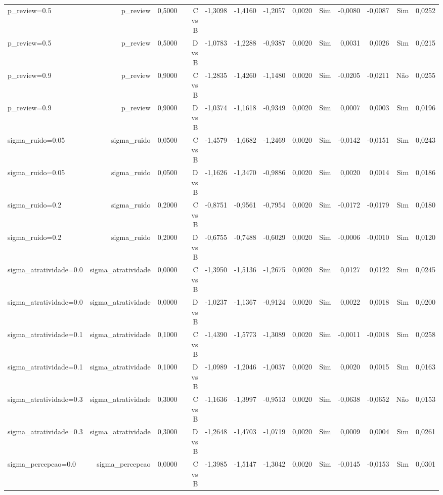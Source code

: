 \begin{table}[ht]
\begin{tabular}{lrrrrrrrrrrrr}
p\_review=0.5 & p\_review & 0,5000 & C vs B & -1,3098 & -1,4160 & -1,2057 & 0,0020 & Sim & -0,0080 & -0,0087 & Sim & 0,0252 \\
p\_review=0.5 & p\_review & 0,5000 & D vs B & -1,0783 & -1,2288 & -0,9387 & 0,0020 & Sim & 0,0031 & 0,0026 & Sim & 0,0215 \\
p\_review=0.9 & p\_review & 0,9000 & C vs B & -1,2835 & -1,4260 & -1,1480 & 0,0020 & Sim & -0,0205 & -0,0211 & Não & 0,0255 \\
p\_review=0.9 & p\_review & 0,9000 & D vs B & -1,0374 & -1,1618 & -0,9349 & 0,0020 & Sim & 0,0007 & 0,0003 & Sim & 0,0196 \\
sigma\_ruido=0.05 & sigma\_ruido & 0,0500 & C vs B & -1,4579 & -1,6682 & -1,2469 & 0,0020 & Sim & -0,0142 & -0,0151 & Sim & 0,0243 \\
sigma\_ruido=0.05 & sigma\_ruido & 0,0500 & D vs B & -1,1626 & -1,3470 & -0,9886 & 0,0020 & Sim & 0,0020 & 0,0014 & Sim & 0,0186 \\
sigma\_ruido=0.2 & sigma\_ruido & 0,2000 & C vs B & -0,8751 & -0,9561 & -0,7954 & 0,0020 & Sim & -0,0172 & -0,0179 & Sim & 0,0180 \\
sigma\_ruido=0.2 & sigma\_ruido & 0,2000 & D vs B & -0,6755 & -0,7488 & -0,6029 & 0,0020 & Sim & -0,0006 & -0,0010 & Sim & 0,0120 \\
sigma\_atratividade=0.0 & sigma\_atratividade & 0,0000 & C vs B & -1,3950 & -1,5136 & -1,2675 & 0,0020 & Sim & 0,0127 & 0,0122 & Sim & 0,0245 \\
sigma\_atratividade=0.0 & sigma\_atratividade & 0,0000 & D vs B & -1,0237 & -1,1367 & -0,9124 & 0,0020 & Sim & 0,0022 & 0,0018 & Sim & 0,0200 \\
sigma\_atratividade=0.1 & sigma\_atratividade & 0,1000 & C vs B & -1,4390 & -1,5773 & -1,3089 & 0,0020 & Sim & -0,0011 & -0,0018 & Sim & 0,0258 \\
sigma\_atratividade=0.1 & sigma\_atratividade & 0,1000 & D vs B & -1,0989 & -1,2046 & -1,0037 & 0,0020 & Sim & 0,0020 & 0,0015 & Sim & 0,0163 \\
sigma\_atratividade=0.3 & sigma\_atratividade & 0,3000 & C vs B & -1,1636 & -1,3997 & -0,9513 & 0,0020 & Sim & -0,0638 & -0,0652 & Não & 0,0153 \\
sigma\_atratividade=0.3 & sigma\_atratividade & 0,3000 & D vs B & -1,2648 & -1,4703 & -1,0719 & 0,0020 & Sim & 0,0009 & 0,0004 & Sim & 0,0261 \\
sigma\_percepcao=0.0 & sigma\_percepcao & 0,0000 & C vs B & -1,3985 & -1,5147 & -1,3042 & 0,0020 & Sim & -0,0145 & -0,0153 & Sim & 0,0301 \\

\end{tabular}
\end{table}
